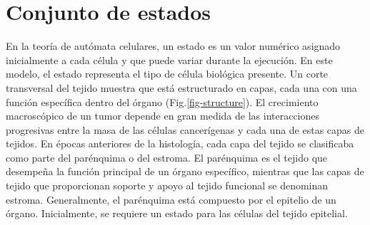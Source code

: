 \section{Conjunto de estados}
\label{subsec-states}
En la teoría de autómata celulares, un estado es un valor numérico asignado inicialmente a cada célula y que puede variar durante la ejecución. En este modelo, el estado representa el tipo de célula biológica presente. Un corte transversal del tejido muestra que está estructurado en capas, cada una con una función específica dentro del órgano (Fig.\ref{fig-structure}). El crecimiento macroscópico de un tumor depende en gran medida de las interacciones progresivas entre la masa de las células cancerígenas y cada una de estas capas de tejidos. En épocas anteriores de la histología, cada capa del tejido se clasificaba como parte del parénquima o del estroma. El parénquima es el tejido que desempeña la función principal de un órgano específico, mientras que las capas de tejido que proporcionan soporte y apoyo al tejido funcional se denominan estroma. Generalmente, el parénquima está compuesto por el epitelio de un órgano. Inicialmente, se requiere un estado para las células del tejido epitelial.

